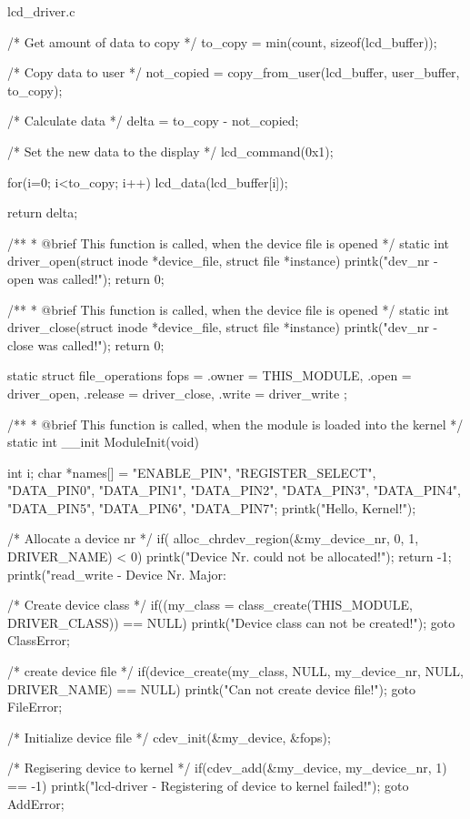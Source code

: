 \documentclass[lang=cn,newtx,10pt,scheme=chinese]{elegantbook}
\begin{document}
\begin{mycode}{lcd\_driver.c}
{    /* Get amount of data to copy */
    to_copy = min(count, sizeof(lcd_buffer));

    /* Copy data to user */
    not_copied = copy_from_user(lcd_buffer, user_buffer, to_copy);

    /* Calculate data */
    delta = to_copy - not_copied;

    /* Set the new data to the display */
    lcd_command(0x1);

    for(i=0; i<to_copy; i++)
        lcd_data(lcd_buffer[i]);

    return delta;
}

/**
 * @brief This function is called, when the device file is opened
 */
static int driver_open(struct inode *device_file, struct file *instance) {
    printk("dev_nr - open was called!\n");
    return 0;
}

/**
 * @brief This function is called, when the device file is opened
 */
static int driver_close(struct inode *device_file, struct file *instance) {
    printk("dev_nr - close was called!\n");
    return 0;
}

static struct file_operations fops = {
    .owner = THIS_MODULE,
    .open = driver_open,
    .release = driver_close,
    .write = driver_write
};

/**
 * @brief This function is called, when the module is loaded into the kernel
 */
static int __init ModuleInit(void) {
    int i;
    char *names[] = {"ENABLE_PIN", "REGISTER_SELECT", "DATA_PIN0", "DATA_PIN1", "DATA_PIN2", "DATA_PIN3", "DATA_PIN4", "DATA_PIN5", "DATA_PIN6", "DATA_PIN7"};
    printk("Hello, Kernel!\n");

    /* Allocate a device nr */
    if( alloc_chrdev_region(&my_device_nr, 0, 1, DRIVER_NAME) < 0) {
        printk("Device Nr. could not be allocated!\n");
        return -1;
    }
    printk("read_write - Device Nr. Major: %

    /* Create device class */
    if((my_class = class_create(THIS_MODULE, DRIVER_CLASS)) == NULL) {
        printk("Device class can not be created!\n");
        goto ClassError;
    }

    /* create device file */
    if(device_create(my_class, NULL, my_device_nr, NULL, DRIVER_NAME) == NULL) {
        printk("Can not create device file!\n");
        goto FileError;
    }

    /* Initialize device file */
    cdev_init(&my_device, &fops);

    /* Regisering device to kernel */
    if(cdev_add(&my_device, my_device_nr, 1) == -1) {
        printk("lcd-driver - Registering of device to kernel failed!\n");
        goto AddError;
    }

}
\end{mycode}
\end{document}
